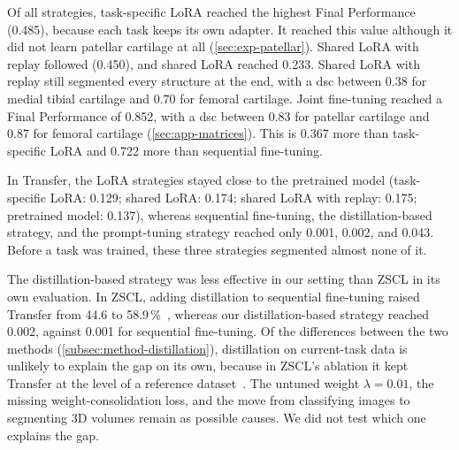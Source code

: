 Of all strategies, task-specific LoRA reached the highest Final Performance (0.485), because each task keeps its own adapter.
It reached this value although it did not learn patellar cartilage at all (\cref{sec:exp-patellar}).
Shared LoRA with replay followed (0.450), and shared LoRA reached 0.233.
Shared LoRA with replay still segmented every structure at the end, with a \gls{dsc} between 0.38 for medial tibial cartilage and 0.70 for femoral cartilage.
Joint fine-tuning reached a Final Performance of 0.852, with a \gls{dsc} between 0.83 for patellar cartilage and 0.87 for femoral cartilage (\cref{sec:app-matrices}).
This is 0.367 more than task-specific LoRA and 0.722 more than sequential fine-tuning.

In Transfer, the LoRA strategies stayed close to the pretrained model (task-specific LoRA: 0.129; shared LoRA: 0.174; shared LoRA with replay: 0.175; pretrained model: 0.137), whereas sequential fine-tuning, the distillation-based strategy, and the prompt-tuning strategy reached only 0.001, 0.002, and 0.043.
Before a task was trained, these three strategies segmented almost none of it.

The distillation-based strategy was less effective in our setting than ZSCL in its own evaluation.
In ZSCL, adding distillation to sequential fine-tuning raised Transfer from 44.6 to 58.9\,\%~\cite[Table~2]{zheng2023preventingzeroshottransferdegradation}, whereas our distillation-based strategy reached 0.002, against 0.001 for sequential fine-tuning.
Of the differences between the two methods (\cref{subsec:method-distillation}), distillation on current-task data is unlikely to explain the gap on its own, because in ZSCL's ablation it kept Transfer at the level of a reference dataset~\cite[Table~1b]{zheng2023preventingzeroshottransferdegradation}.
The untuned weight $\lambda = 0.01$, the missing weight-consolidation loss, and the move from classifying images to segmenting 3D volumes remain as possible causes.
We did not test which one explains the gap.

